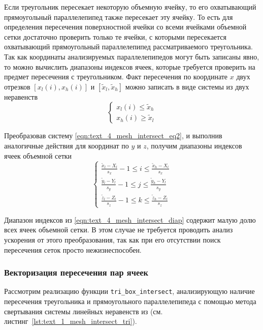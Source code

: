 Если треугольник пересекает некоторую объемную ячейку, то его охватывающий прямоугольный параллелепипед также пересекает эту ячейку.
То есть для определения пересечения поверхностной ячейки со всеми ячейками объемной сетки достаточно проверить только те ячейки, с которыми пересекается охватывающий прямоугольный параллелепипед рассматриваемого треугольника.
Так как координаты анализируемых параллелепипедов могут быть записаны явно, то можно вычислить диапазоны индексов ячеек, которые требуется проверить на предмет пересечения с треугольником.
Факт пересечения по координате $x$ двух отрезков $[x_l(i), x_h(i)]$ и $[\tilde{x}_l, \tilde{x}_h]$ можно записать в виде системы из двух неравенств
\begin{equation}\label{eqn:text_4_mesh_intersect_eq2}
	\left\{
		\begin{aligned}
			x_l(i) \le \tilde{x}_h \\
			x_h(i) \ge \tilde{x}_l
		\end{aligned}
	\right.
\end{equation}

Преобразовав систему \eqref{eqn:text_4_mesh_intersect_eq2}, и выполнив аналогичные действия для координат по $y$ и $z$, получим диапазоны индексов ячеек объемной сетки
\begin{equation}\label{eqn:text_4_mesh_intersect_diap}
	\left\{
		\begin{aligned}
			\frac{\tilde{x}_l - X_l}{s_x} - 1 \le i \le \frac{\tilde{x}_h - X_l}{s_x} \\
			\frac{\tilde{y}_l - Y_l}{s_y} - 1 \le j \le \frac{\tilde{y}_h - Y_l}{s_y} \\
			\frac{\tilde{z}_l - Z_l}{s_z} - 1 \le k \le \frac{\tilde{z}_h - Z_l}{s_z}
		\end{aligned}
	\right.
\end{equation}

Диапазон индексов из \eqref{eqn:text_4_mesh_intersect_diap} содержит малую долю всех ячеек объемной сетки.
В этом случае не требуется проводить анализ ускорения от этого преобразования, так как при его отсутствии поиск пересечения сеток просто нежизнеспособен.

\subsubsection{Векторизация пересечения пар ячеек}

Рассмотрим реализацию функции \texttt{tri\_box\_intersect}, анализирующую наличие пересечения треугольника и прямоугольного параллелепипеда с помощью метода свертывания системы линейных неравенств\label{term:method_svert_sys_neravenstv2} из \cite{Chernikov1963} (см. листинг~\ref{lst:text_1_mesh_intersect_tri}).


